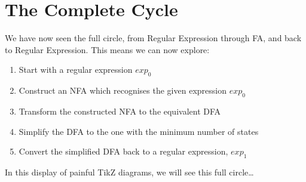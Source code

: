 \section{The Complete Cycle}
We have now seen the full circle, from Regular Expression through FA, and back to Regular Expression. This means we can now explore:
\begin{enumerate}
    \item Start with a regular expression $exp_0$
    \item Construct an NFA which recognises the given expression $exp_0$
    \item Transform the constructed NFA to the equivalent DFA
    \item Simplify the DFA to the one with the minimum number of states
    \item Convert the simplified DFA back to a regular expression, $exp_1$
\end{enumerate}

In this display of painful TikZ diagrams, we will see this full circle\ldots

